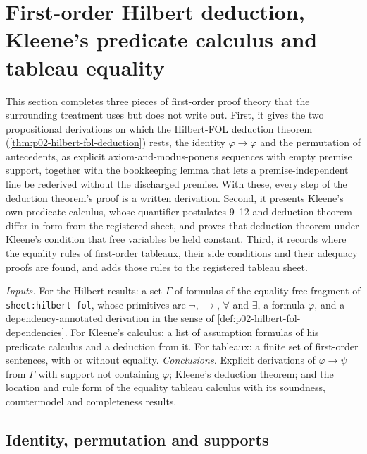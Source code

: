 \section{First-order Hilbert deduction, Kleene's predicate calculus and tableau equality}
\label{sec:p02-w02-p02-025-fol-calculi}

This section completes three pieces of first-order proof theory that the
surrounding treatment uses but does not write out.  First, it gives the two
propositional derivations on which the Hilbert-FOL deduction theorem
(\cref{thm:p02-hilbert-fol-deduction}) rests, the identity
\(\varphi\to\varphi\) and the permutation of antecedents, as explicit
axiom-and-modus-ponens sequences with empty premise support, together with
the bookkeeping lemma that lets a premise-independent line be rederived
without the discharged premise.  With these, every step of the deduction
theorem's proof is a written derivation.  Second, it presents Kleene's own
predicate calculus, whose quantifier postulates 9--12 and deduction theorem
differ in form from the registered sheet, and proves that deduction theorem
under Kleene's condition that free variables be held constant.  Third, it
records where the equality rules of first-order tableaux, their
side conditions and their adequacy proofs are found, and adds those rules to
the registered tableau sheet.

\emph{Inputs.}  For the Hilbert results: a set \(\Gamma\) of formulas of the
equality-free fragment of \texttt{sheet:\allowbreak hilbert-fol}, whose
primitives are \(\neg\), \(\to\), \(\forall\) and \(\exists\), a formula
\(\varphi\), and a
dependency-annotated derivation in the sense of
\cref{def:p02-hilbert-fol-dependencies}.  For Kleene's calculus: a list of
assumption formulas of his predicate calculus and a deduction from it.  For
tableaux: a finite set of first-order sentences, with or without equality.
\emph{Conclusions.}  Explicit derivations of \(\varphi\to\psi\) from
\(\Gamma\) with support not containing \(\varphi\); Kleene's deduction
theorem; and the location and rule form of the equality tableau calculus with
its soundness, countermodel and completeness results.

\subsection{Identity, permutation and supports}
\label{sec:p02-w02-p02-025-kernels}

